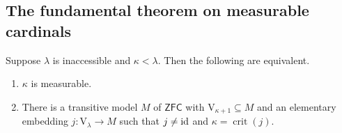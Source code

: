 \subsection{The fundamental theorem on measurable cardinals}
\begin{theorem}
    Suppose \( \lambda \) is inaccessible and \( \kappa < \lambda \).
    Then the following are equivalent.
    \begin{enumerate}
        \item \( \kappa \) is measurable.
        \item There is a transitive model \( M \) of \( \mathsf{ZFC} \) with \( \mathrm{V}_{\kappa + 1} \subseteq M \) and an elementary embedding \( j : \mathrm{V}_\lambda \to M \) such that \( j \neq \operatorname{id} \) and \( \kappa = \operatorname{crit}(j) \).
    \end{enumerate}
\end{theorem}
